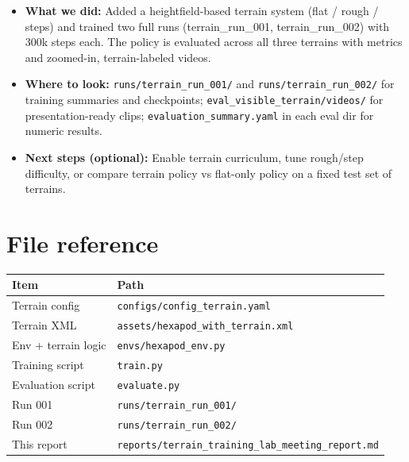 \documentclass[11pt]{article}
\begin{document}
\begin{itemize}
  \item \textbf{What we did:} Added a heightfield-based terrain system (flat / rough / steps) and trained two full runs (terrain\_run\_001, terrain\_run\_002) with 300k steps each. The policy is evaluated across all three terrains with metrics and zoomed-in, terrain-labeled videos.
  \item \textbf{Where to look:} \texttt{runs/terrain\_run\_001/} and \texttt{runs/terrain\_run\_002/} for training summaries and checkpoints; \texttt{eval\_visible\_terrain/videos/} for presentation-ready clips; \texttt{evaluation\_summary.yaml} in each eval dir for numeric results.
  \item \textbf{Next steps (optional):} Enable terrain curriculum, tune rough/step difficulty, or compare terrain policy vs flat-only policy on a fixed test set of terrains.
\end{itemize}

\section{File reference}

\begin{table}[h]
  \centering
  \begin{tabular}{ll}
    \toprule
    Item & Path \\
    \midrule
    Terrain config & \texttt{configs/config\_terrain.yaml} \\
    Terrain XML & \texttt{assets/hexapod\_with\_terrain.xml} \\
    Env + terrain logic & \texttt{envs/hexapod\_env.py} \\
    Training script & \texttt{train.py} \\
    Evaluation script & \texttt{evaluate.py} \\
    Run 001 & \texttt{runs/terrain\_run\_001/} \\
    Run 002 & \texttt{runs/terrain\_run\_002/} \\
    This report & \texttt{reports/terrain\_training\_lab\_meeting\_report.md} \\
    \bottomrule
  \end{tabular}
\end{table}
\end{document}
